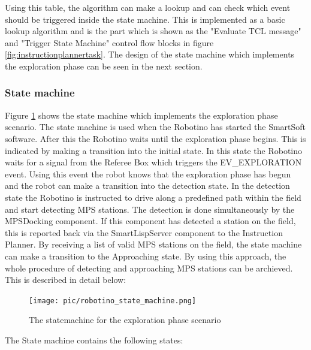 \bigskip

Using this table, the algorithm can make a lookup and can check which event should be triggered inside the state machine. This is implemented as a basic lookup algorithm and is the part  which is shown as the "Evaluate TCL message" and "Trigger State Machine" control flow blocks in figure \ref{fig:instructionplannertask}. The design of the state machine which implements the exploration phase can be seen in the next section. 
  

\subsubsection{State machine}
\label{sec:state_machine}

Figure \ref{fig:statemachine} shows the state machine which implements the exploration phase scenario. The state machine is used when the Robotino has started the SmartSoft software. After this the Robotino waits until the exploration phase begins. This is indicated by making a transition into the initial state. In this state the Robotino waits for a signal from the Referee Box which triggers the EV\_EXPLORATION event. Using this event the robot knows that the exploration phase has begun and the robot can make a transition into the detection state. In the detection state the Robotino is instructed to drive along a predefined path within the field and start detecting MPS stations. The detection is done simultaneously by the MPSDocking component. If this component has detected a station on the field, this is reported back via the SmartLispServer component to the Instruction Planner. By receiving a list of valid MPS stations on the field, the state machine can make a transition to the Approaching state. By using this approach, the whole procedure of detecting and approaching MPS stations can be archieved. This is described in detail below: \\


\begin{figure}
\centering
\texttt{[image: pic/robotino\_state\_machine.png]}
\caption{The statemachine for the exploration phase scenario}
\label{fig:statemachine}
\end{figure}


The State machine contains the following states:


